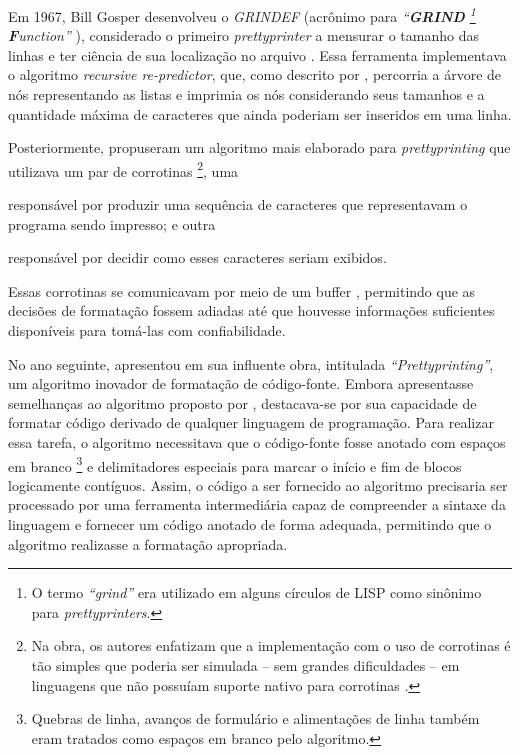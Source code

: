 \documentclass
  [11pt, a4paper, english, openright, sumario = tradicional, twoside, brazil]
  {abntex2}
\begin{document}
  Em 1967, Bill Gosper desenvolveu o \textit{GRINDEF} (acrônimo para
  \textit
    {``\textbf{GRIND}%
       \footnote
         {O termo \textit{``grind''} era utilizado em alguns círculos de LISP
          como sinônimo para \textit{prettyprinters}.}
       \textbf{F}unction''}%
  ), considerado o primeiro \textit{prettyprinter} a mensurar o tamanho das
  linhas e ter ciência de sua localização no arquivo
  \cites{gosper-2023-twubblesome}{griesemer-2022-cultural}. Essa ferramenta
  implementava o algoritmo \textit{recursive re-predictor}, que, como descrito
  por \textcite{goldstein-1973-pretty}, percorria a árvore de nós representando
  as listas e imprimia os nós considerando seus tamanhos e a quantidade máxima
  de caracteres que ainda poderiam ser inseridos em uma linha.

  Posteriormente, \textcite{hearn-1979-one} propuseram um algoritmo mais
  elaborado para \textit{prettyprinting} que utilizava um par de corrotinas%
  \footnote
    {Na obra, os autores enfatizam que a implementação com o uso de corrotinas
     é tão simples que poderia ser simulada -- sem grandes dificuldades -- em
     linguagens que não possuíam suporte nativo para corrotinas
     \cite[53]{hearn-1979-one}.},
  uma
  \begin{inparaenum}
    \item responsável por produzir uma sequência de caracteres que
          representavam o programa sendo impresso; e outra
    \item responsável por decidir como esses caracteres seriam exibidos.
  \end{inparaenum}
  Essas corrotinas se comunicavam por meio de um buffer ,
  permitindo que as decisões de formatação fossem adiadas até que houvesse
  informações suficientes disponíveis para tomá-las com confiabilidade.

  No ano seguinte, \textcite{oppen-1980-prettyprinting} apresentou em sua
  influente obra, intitulada \textit{``Prettyprinting''}, um algoritmo inovador
  de formatação de código-fonte. Embora apresentasse semelhanças ao algoritmo
  proposto por \textcite{hearn-1979-one}, destacava-se por sua capacidade de
  formatar código derivado de qualquer linguagem de programação. Para realizar
  essa tarefa, o algoritmo necessitava que o código-fonte fosse anotado com
  espaços em branco%
  \footnote
    {Quebras de linha, avanços de formulário e alimentações de linha também
     eram tratados como espaços em branco pelo algoritmo.}
  e delimitadores especiais para marcar o início e fim de blocos logicamente
  contíguos. Assim, o código a ser fornecido ao algoritmo precisaria ser
  processado por uma ferramenta intermediária capaz de compreender a sintaxe da
  linguagem e fornecer um código anotado de forma adequada, permitindo que o
  algoritmo realizasse a formatação apropriada.
\end{document}
